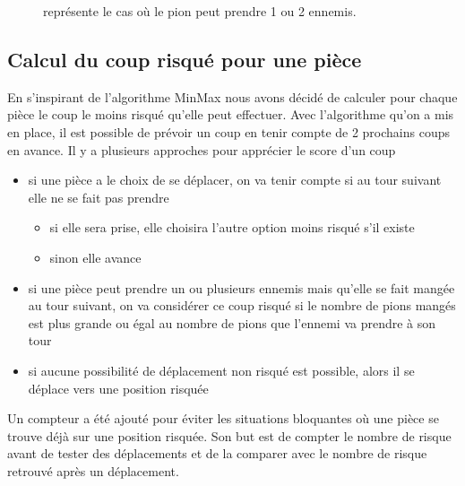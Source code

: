 \documentclass[11pt]{article} %
\begin{document}
\begin{figure}
\caption{représente le cas où le pion peut prendre 1 ou 2 ennemis.}
\label{fig_sim}
\centering
{}
\end{figure}


\subsection{Calcul du coup risqué pour une pièce}

En s’inspirant de l’algorithme MinMax nous avons décidé de calculer pour chaque pièce le coup le moins risqué qu’elle peut effectuer. Avec l’algorithme qu’on a mis en place, il est possible de prévoir un coup en tenir compte de 2 prochains coups en avance. 
Il y a plusieurs approches pour apprécier le score d’un coup
\begin{itemize}
\item si une pièce a le choix de se déplacer, on va tenir compte si au tour suivant elle ne se fait pas prendre
\begin{itemize}
\item si elle sera prise, elle choisira l’autre option moins risqué s’il existe
\item sinon elle avance
\end{itemize}
\item si une pièce peut prendre un ou plusieurs ennemis mais qu’elle se fait mangée au tour suivant, on va considérer ce coup risqué si le nombre de pions mangés est plus grande ou égal au nombre de pions que l’ennemi va prendre à son tour
\item si aucune possibilité de déplacement non risqué est possible, alors il se déplace vers une position risquée
\end{itemize}

Un compteur a été ajouté pour éviter les situations bloquantes où une pièce se trouve déjà sur une position risquée. Son but est de compter le nombre de risque avant de tester des déplacements et de la comparer avec le nombre de risque retrouvé après un déplacement. 
\end{document}
